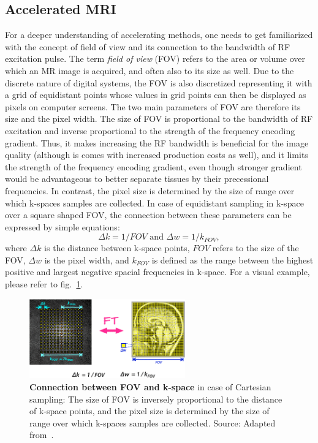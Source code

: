 \subsection{Accelerated MRI}
For a deeper understanding of accelerating methods, one needs to get familiarized with the concept of field of view and its connection to the bandwidth of RF excitation pulse. The term \textit{field of view} (FOV) refers to the area or volume over which an MR image is acquired, and often also to its size as well. Due to the discrete nature of digital systems, the FOV is also discretized representing it with a grid of equidistant points whose values in grid points can then be displayed as pixels on computer screens. The two main parameters of FOV are therefore its size and the pixel width. The size of FOV is proportional to the bandwidth of RF excitation and inverse proportional to the strength of the frequency encoding gradient. Thus, it makes increasing the RF bandwidth is beneficial for the image quality (although is comes with increased production costs as well), and it limits the strength of the frequency encoding gradient, even though stronger gradient would be advantageous to better separate tissues by their precessional frequencies. In contrast, the pixel size is determined by the size of range over which k-spaces samples are collected. In case of equidistant sampling in k-space over a square shaped FOV, the connection between these parameters can be expressed by simple equations:
\[\Delta k = 1 / FOV \text{ and } \Delta w = 1 / k_{FOV},\]
where $\Delta k$ is the distance between k-space points, $FOV$ refers to the size of the FOV, $\Delta w$ is the pixel width, and $k_{FOV}$ is defined as the range between the highest positive and largest negative spacial frequencies in k-space. For a visual example, please refer to fig.~\ref{fig:cartesian}.

\begin{figure}[htb]
    \centering
    \includegraphics[width=0.6\textwidth]{images/cartesian.png}
    \caption{\textbf{Connection between FOV and k-space} in case of Cartesian sampling: The size of FOV is inversely proportional to the distance of k-space points, and the pixel size is determined by the size of range over which k-spaces samples are collected. Source: Adapted from~\cite{noauthor_kspace_nodate}.}
    \label{fig:cartesian}
\end{figure}

